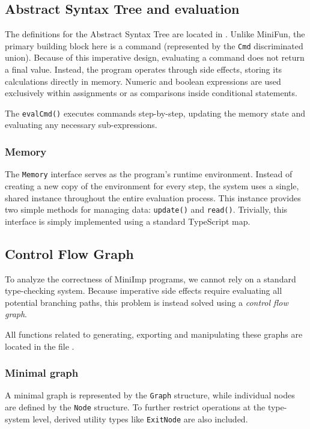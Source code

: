 \documentclass[12pt]{article}
\newcommand{\Code}[1]{\texttt{#1}}
\begin{document}
\subsection{Abstract Syntax Tree and evaluation}

The definitions for the Abstract Syntax Tree are located in
. Unlike MiniFun, the primary building block here is
a command (represented by the \Code{Cmd} discriminated union). Because of this
imperative design, evaluating a command does not return a final value. Instead,
the program operates through side effects, storing its calculations directly in
memory. Numeric and boolean expressions are used exclusively within assignments
or as comparisons inside conditional statements.

The \Code{evalCmd()} executes commands step-by-step, updating the memory state
and evaluating any necessary sub-expressions.

\subsubsection{Memory}

The \Code{Memory} interface serves as the program's runtime environment. Instead
of creating a new copy of the environment for every step, the system uses a
single, shared instance throughout the entire evaluation process. This instance
provides two simple methods for managing data: \Code{update()} and
\Code{read()}. Trivially, this interface is simply implemented using a standard
TypeScript map.

\subsection{Control Flow Graph}

To analyze the correctness of MiniImp programs, we cannot rely on a standard
type-checking system. Because imperative side effects require evaluating all
potential branching paths, this problem is instead solved using a
\textit{control flow graph}.

All functions related to generating, exporting and manipulating these graphs are
located in the file .

\subsubsection{Minimal graph}

A minimal graph is represented by the \Code{Graph} structure, while individual
nodes are defined by the \Code{Node} structure. To further restrict operations
at the type-system level, derived utility types like \Code{ExitNode} are also
included.
\end{document}
